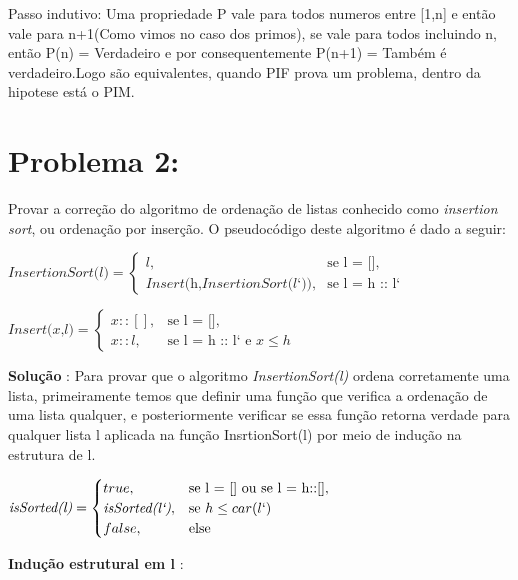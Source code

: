 \documentclass[a4paper, 10pt]{article}
\begin{document}
Passo indutivo: Uma propriedade P vale para todos numeros entre [1,n] e então vale para n+1(Como vimos no caso dos primos), se vale para todos incluindo n, então P(n) = Verdadeiro e por consequentemente P(n+1) = Também é verdadeiro.Logo são equivalentes, quando PIF prova um problema, dentro da hipotese está o PIM.\checkmark




\section{Problema 2:}

Provar a correção do algoritmo de ordenação de listas conhecido como \textit {insertion sort}, ou ordenação por inserção.
O pseudocódigo deste algoritmo é dado a seguir:\\

\begin{center}
$\textit{InsertionSort(l)}=\begin{cases}
l,& \text{se l = []},\\
\textit{Insert(h,InsertionSort(l`))},& \text{se l = h :: l`}
\end{cases}$
\end{center}
\begin{center}
$\textit{Insert(x,l)}=\begin{cases}
x :: [],& \text{se l = []},\\
x ::l,& \text{se l = h :: l` e $x \leq h$}
\end{cases}$
\end{center}


\textbf{Solução} : 
Para provar que o algoritmo \textit{InsertionSort(l)} ordena corretamente uma lista, primeiramente temos que definir uma função que verifica a ordenação de uma lista qualquer, e posteriormente verificar se essa função retorna verdade para qualquer lista l aplicada na função InsrtionSort(l) por meio de indução na estrutura de l.\\

\begin{center}
$\textit{isSorted(l)}=\begin{cases}
true,& \text{se l = [] ou se l = h::[]},\\
\textit{isSorted(l`)},& \text{se $h \leq car(l`)$}\\
false,& \text{else}
\end{cases}$
\end{center}

\textbf{Indução estrutural em l} :
\end{document}
